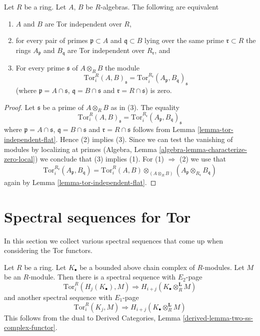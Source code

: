 \begin{lemma}
\label{lemma-tor-independent}
Let $R$ be a ring. Let $A$, $B$ be $R$-algebras. The following are equivalent
\begin{enumerate}
\item $A$ and $B$ are Tor independent over $R$,
\item for every pair of primes $\mathfrak p \subset A$ and
$\mathfrak q \subset B$ lying over the same prime $\mathfrak r \subset R$
the rings $A_\mathfrak p$ and $B_\mathfrak q$ are Tor independent over
$R_\mathfrak r$, and
\item For every prime $\mathfrak s$ of $A \otimes_R B$ the module
$$
\text{Tor}_i^R(A, B)_\mathfrak s =
\text{Tor}_i^{R_\mathfrak r}(A_\mathfrak p, B_\mathfrak q)_\mathfrak s
$$
(where $\mathfrak p = A \cap \mathfrak s$, $\mathfrak q = B \cap \mathfrak s$
and $\mathfrak r = R \cap \mathfrak s$) is zero.
\end{enumerate}
\end{lemma}

\begin{proof}
Let $\mathfrak s$ be a prime of $A \otimes_R B$ as in (3).
The equality
$$
\text{Tor}_i^R(A, B)_\mathfrak s =
\text{Tor}_i^{R_\mathfrak r}(A_\mathfrak p, B_\mathfrak q)_\mathfrak s
$$
where $\mathfrak p = A \cap \mathfrak s$, $\mathfrak q = B \cap \mathfrak s$
and $\mathfrak r = R \cap \mathfrak s$ follows from
Lemma \ref{lemma-tor-independent-flat}.
Hence (2) implies (3).
Since we can test the vanishing of modules by localizing at primes
(Algebra, Lemma \ref{algebra-lemma-characterize-zero-local})
we conclude that (3) implies (1). For
(1) $\Rightarrow$ (2) we use that
$$
\text{Tor}_i^{R_\mathfrak r}(A_\mathfrak p, B_\mathfrak q) =
\text{Tor}_i^R(A, B) \otimes_{(A \otimes_R B)}
(A_\mathfrak p \otimes_{R_{\mathfrak r}} B_\mathfrak q)
$$
again by Lemma \ref{lemma-tor-independent-flat}.
\end{proof}








\section{Spectral sequences for Tor}
\label{section-spectral-sequence-tor}


\noindent
In this section we collect various spectral sequences that come up
when considering the Tor functors.

\begin{example}
\label{example-cohomology-complex-tensored}
Let $R$ be a ring. Let $K_\bullet$ be a bounded above chain complex
of $R$-modules. Let $M$ be an $R$-module. Then there is a
spectral sequence with $E_2$-page
$$
\text{Tor}^R_i(H_j(K_\bullet), M)
\Rightarrow
H_{i + j}(K_\bullet \otimes^{\mathbf{L}}_R M)
$$
and another spectral sequence with $E_1$-page
$$
\text{Tor}^R_i(K_j, M)
\Rightarrow
H_{i + j}(K_\bullet \otimes^{\mathbf{L}}_R M)
$$
This follows from the dual to
Derived Categories, Lemma \ref{derived-lemma-two-ss-complex-functor}.
\end{example}


